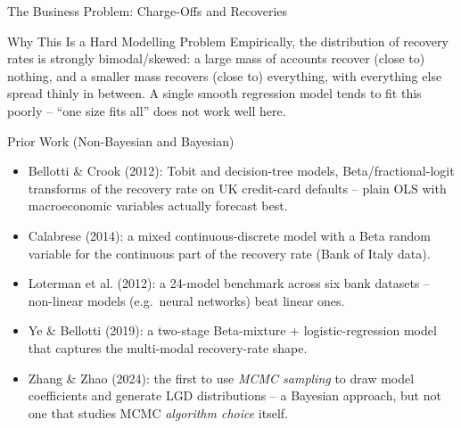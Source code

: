 \documentclass[aspectratio=169,10pt]{beamer}
\begin{document}
\begin{frame}[allowframebreaks]{The Business Problem: Charge-Offs and Recoveries}
\framebreak

\begin{block}{Why This Is a Hard Modelling Problem}
Empirically, the distribution of recovery rates is strongly bimodal/skewed: a large mass of accounts recover (close to) nothing, and a smaller mass recovers (close to) everything, with everything else spread thinly in between. A single smooth regression model tends to fit this poorly -- ``one size fits all'' does not work well here.
\end{block}

\begin{block}{Prior Work (Non-Bayesian and Bayesian)}
\begin{itemize}
  \item Bellotti \& Crook (2012): Tobit and decision-tree models, Beta/fractional-logit transforms of the recovery rate on UK credit-card defaults -- plain OLS with macroeconomic variables actually forecast best.
  \item Calabrese (2014): a mixed continuous-discrete model with a Beta random variable for the continuous part of the recovery rate (Bank of Italy data).
  \item Loterman et al. (2012): a 24-model benchmark across six bank datasets -- non-linear models (e.g.\ neural networks) beat linear ones.
  \item Ye \& Bellotti (2019): a two-stage Beta-mixture + logistic-regression model that captures the multi-modal recovery-rate shape.
  \item Zhang \& Zhao (2024): the first to use \emph{MCMC sampling} to draw model coefficients and generate LGD distributions -- a Bayesian approach, but not one that studies MCMC \emph{algorithm choice} itself.
\end{itemize}
\end{block}

\framebreak


\end{frame}
\end{document}
